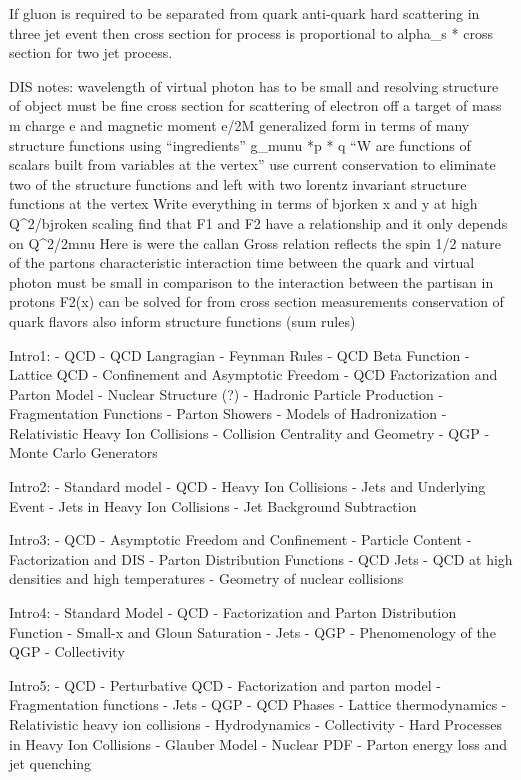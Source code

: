 If gluon is required to be separated from quark anti-quark hard scattering in three jet event then cross section for process is proportional to alpha_s * cross section for two jet process.

DIS notes:
wavelength of virtual photon has to be small and resolving structure of object must be fine
cross section for scattering of electron off a target of mass m charge e and magnetic moment e/2M
generalized form in terms of many structure functions using “ingredients” g_munu *p * q
“W are functions of scalars built from variables at the vertex”
use current conservation to eliminate two of the structure functions and left with two lorentz invariant structure functions at the vertex 
Write everything in terms of bjorken x and y
at high Q^2/bjroken scaling find that F1 and F2 have a relationship and it only depends on Q^2/2mnu
Here is were the callan Gross relation reflects the spin 1/2 nature of the partons 
characteristic interaction time between the quark and virtual photon must be small in comparison to the interaction between the partisan in protons 
F2(x) can be solved for from cross section measurements
conservation of quark flavors also inform structure functions (sum rules) 

Intro1:
- QCD
	- QCD Langragian 
		- Feynman Rules
		- QCD Beta Function
		- Lattice QCD
	- Confinement and Asymptotic Freedom
	- QCD Factorization and Parton Model
- Nuclear Structure (?)
- Hadronic Particle Production
	- Fragmentation Functions
	- Parton Showers
	- Models of Hadronization
- Relativistic Heavy Ion Collisions
	- Collision Centrality and Geometry
	- QGP
- Monte Carlo Generators

Intro2: 
- Standard model
	- QCD
- Heavy Ion Collisions
- Jets and Underlying Event
	- Jets in Heavy Ion Collisions 
	- Jet Background Subtraction

Intro3: 
- QCD
	- Asymptotic Freedom and Confinement
	- Particle Content
	- Factorization and DIS
	- Parton Distribution Functions
	- QCD Jets
- QCD at high densities and high temperatures
	- Geometry of nuclear collisions

Intro4: 
- Standard Model
- QCD
- Factorization and Parton Distribution Function
- Small-x and Gloun Saturation
- Jets
- QGP
- Phenomenology of the QGP
- Collectivity 

Intro5: 
- QCD
- Perturbative QCD 
	- Factorization and parton model
	- Fragmentation functions
	- Jets
- QGP
	- QCD Phases
	- Lattice thermodynamics
	- Relativistic heavy ion collisions
	- Hydrodynamics 
	- Collectivity
- Hard Processes in Heavy Ion Collisions
	- Glauber Model
	- Nuclear PDF
	- Parton energy loss and jet quenching



